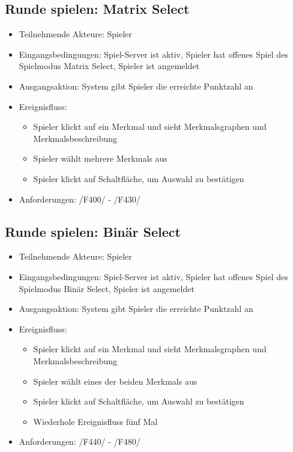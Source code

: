 \documentclass[a4paper]{scrreprt}
\begin{document}
    \subsection{Runde spielen: Matrix Select}
    \begin{itemize}
    	\item Teilnehmende Akteure: \Gls{Spieler}

    	\item Eingangsbedingungen: \Gls{Spiel-Server} ist aktiv, \Gls{Spieler} hat offenes \Gls{Spiel} des \Gls{Spielmodus} Matrix Select, \Gls{Spieler} ist angemeldet
        \item Ausgangsaktion: System gibt Spieler die erreichte Punktzahl an
    	\item Ereignisfluss:
    	\begin{itemize}
    		\item \Gls{Spieler} klickt auf ein \Gls{Merkmal} und sieht Merkmalsgraphen und Merkmalsbeschreibung
    		\item \Gls{Spieler} wählt mehrere \Glspl{Merkmal} aus
    		\item \Gls{Spieler} klickt auf Schaltfläche, um Auswahl zu bestätigen
    	\end{itemize}
        \item Anforderungen: /F400/ - /F430/
    \end{itemize}
	
	\subsection{Runde spielen: Binär Select}
	\begin{itemize}
		\item Teilnehmende Akteure: \Gls{Spieler}

		\item Eingangsbedingungen: \Gls{Spiel-Server} ist aktiv, \Gls{Spieler} hat offenes \Gls{Spiel} des \Gls{Spielmodus} Binär Select, \Gls{Spieler} ist angemeldet
        \item Ausgangsaktion: System gibt \Gls{Spieler} die erreichte Punktzahl an
		\item Ereignisfluss:
		\begin{itemize}
			\item \Gls{Spieler} klickt auf ein \Gls{Merkmal} und sieht Merkmalsgraphen und Merkmalsbeschreibung
			\item \Gls{Spieler} wählt eines der beiden \Glspl{Merkmal} aus
			\item \Gls{Spieler} klickt auf Schaltfläche, um Auswahl zu bestätigen
            \item Wiederhole Ereignisfluss fünf Mal
		\end{itemize}
        \item Anforderungen: /F440/ - /F480/
	\end{itemize}
\end{document}
